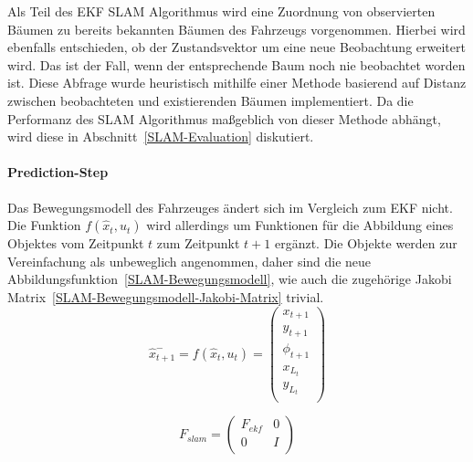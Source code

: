 \documentclass[11pt]{article}
\begin{document}
Als Teil des EKF SLAM Algorithmus wird eine Zuordnung von observierten Bäumen zu bereits bekannten Bäumen des Fahrzeugs vorgenommen. Hierbei wird ebenfalls entschieden, ob der Zustandsvektor um eine neue Beobachtung erweitert wird. Das ist der Fall, wenn der entsprechende Baum noch nie beobachtet worden ist. Diese Abfrage wurde heuristisch mithilfe einer Methode basierend auf Distanz zwischen beobachteten und existierenden Bäumen implementiert. Da die Performanz des SLAM Algorithmus maßgeblich von dieser Methode abhängt, wird diese in Abschnitt~\ref{SLAM-Evaluation} diskutiert. 

\paragraph{Prediction-Step}
Das Bewegungsmodell des Fahrzeuges ändert sich im Vergleich zum EKF nicht. Die Funktion $f(\hat{x}_t, u_t)$ wird allerdings um Funktionen für die Abbildung eines Objektes vom Zeitpunkt $t$ zum Zeitpunkt $t+1$ ergänzt. Die Objekte werden zur Vereinfachung als unbeweglich angenommen, daher sind die neue Abbildungsfunktion~\ref{SLAM-Bewegungsmodell}, wie auch die zugehörige Jakobi Matrix~\eqref{SLAM-Bewegungsmodell-Jakobi-Matrix} trivial.
\begin{equation}\label{SLAM-Bewegungsmodell}
	\hat{x}_{t+1}^- = f(\hat{x}_{t},u_t) = \begin{pmatrix}
		x_{t+1} \\
		y_{t+1} \\
		\phi_{t+1} \\
		x_{L_t} \\
		y_{L_t} \\
	\end{pmatrix}
\end{equation}

\begin{equation}\label{SLAM-Bewegungsmodell-Jakobi-Matrix}
	F_{slam} = \begin{pmatrix}
		F_{ekf} & 0 \\
		0 & I \\
	\end{pmatrix}
\end{equation}
\end{document}
